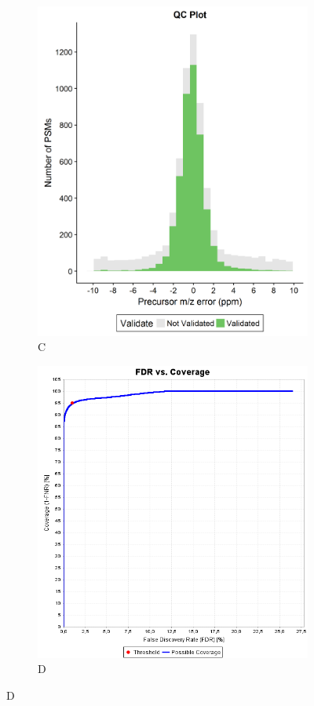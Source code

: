 \documentclass[11pt, a4paper]{report}
\begin{document}
\begin{figure}[!h]
\begin{subfigure}{.45\textwidth}
  \centering
    \caption*{C}
  \includegraphics[width=.95\linewidth]{qc}
\end{subfigure}
\begin{subfigure}{.45\textwidth}
  \centering
    \caption*{D}
  \includegraphics[width=.95\linewidth]{roc}

\end{subfigure}
\end{figure}
\end{document}
